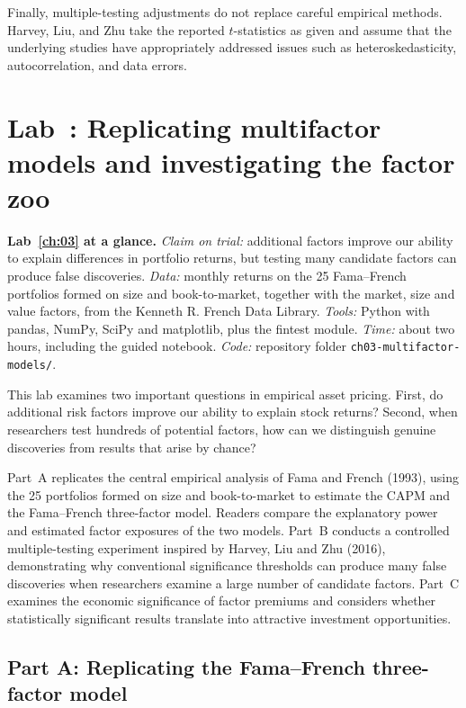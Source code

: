 Finally, multiple-testing adjustments do not replace
careful empirical methods. Harvey, Liu, and Zhu take the
reported $t$-statistics as given and assume that the
underlying studies have appropriately addressed issues
such as heteroskedasticity, autocorrelation, and data
errors. 

\section{Lab~\thechapter: Replicating multifactor models and investigating the factor zoo}
\label{sec:03-lab}

\begin{callout}
\textbf{Lab~\ref{ch:03} at a glance.} \emph{Claim on trial:} additional factors improve our ability to explain differences in portfolio returns, but testing many candidate factors can produce false discoveries. \emph{Data:} monthly returns on the 25 Fama--French portfolios formed on size and book-to-market, together with the market, size and value factors, from the Kenneth R. French Data Library. \emph{Tools:} Python with pandas, NumPy, SciPy and matplotlib, plus the fintest module. \emph{Time:} about two hours, including the guided notebook. \emph{Code:} repository folder \texttt{ch03-multifactor-models/}.
\end{callout}

This lab examines two important questions in empirical asset pricing. First, do additional risk factors improve our ability to explain stock returns? Second, when researchers test hundreds of potential factors, how can we distinguish genuine discoveries from results that arise by chance?

Part~A replicates the central empirical analysis of Fama and French (1993), using the 25 portfolios formed on size and book-to-market to estimate the CAPM and the Fama--French three-factor model. Readers compare the explanatory power and estimated factor exposures of the two models. Part~B conducts a controlled multiple-testing experiment inspired by Harvey, Liu and Zhu (2016), demonstrating why conventional significance thresholds can produce many false discoveries when researchers examine a large number of candidate factors. Part~C examines the economic significance of factor premiums and considers whether statistically significant results translate into attractive investment opportunities.

\subsection*{Part A: Replicating the Fama--French three-factor model}

